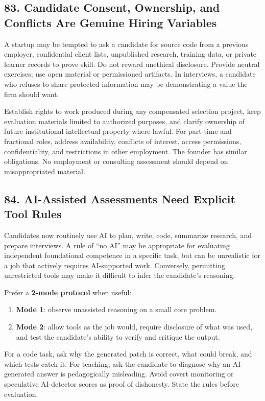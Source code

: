 \subsection*{83. Candidate Consent, Ownership, and Conflicts Are Genuine Hiring Variables}

A startup may be tempted to ask a candidate for source code from a previous employer, confidential client lists, unpublished research, training data, or private learner records to prove skill. Do not reward unethical disclosure. Provide neutral exercises; use open material or permissioned artifacts. In interviews, a candidate who refuses to share protected information may be demonstrating a value the firm should want.

Establish rights to work produced during any compensated selection project, keep evaluation materials limited to authorized purposes, and clarify ownership of future institutional intellectual property where lawful. For part-time and fractional roles, address availability, conflicts of interest, access permissions, confidentiality, and restrictions in other employment. The founder has similar obligations. No employment or consulting assessment should depend on misappropriated material.

\subsection*{84. AI-Assisted Assessments Need Explicit Tool Rules}

Candidates now routinely use AI to plan, write, code, summarize research, and prepare interviews. A rule of ``no AI'' may be appropriate for evaluating independent foundational competence in a specific task, but can be unrealistic for a job that actively requires AI-supported work. Conversely, permitting unrestricted tools may make it difficult to infer the candidate's reasoning.

Prefer a \textbf{2-mode protocol} when useful:
\begin{enumerate}[leftmargin=*]
\item \textbf{Mode 1}: observe unassisted reasoning on a small core problem.
\item \textbf{Mode 2}: allow tools as the job would, require disclosure of what was used, and test the candidate's ability to verify and critique the output.
\end{enumerate}
For a code task, ask why the generated patch is correct, what could break, and which tests catch it. For teaching, ask the candidate to diagnose why an AI-generated answer is pedagogically misleading. Avoid covert monitoring or speculative AI-detector scores as proof of dishonesty. State the rules before evaluation.

